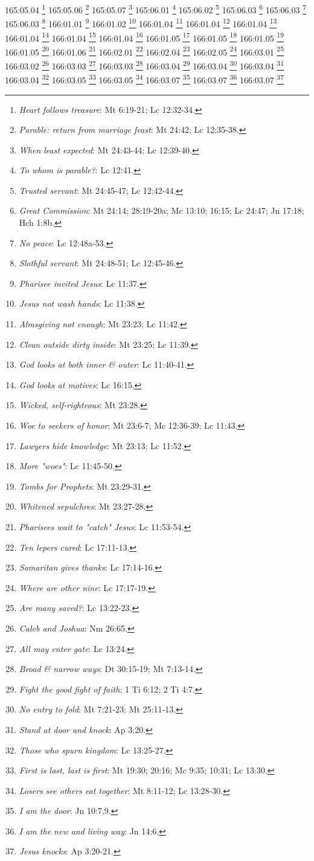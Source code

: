 165:05.04 \footnote{\textit{Heart follows treasure}: Mt 6:19-21; Lc 12:32-34.}
165:05.06 \footnote{\textit{Parable: return from marriage feast}: Mt 24:42; Lc 12:35-38.}
165:05.07 \footnote{\textit{When least expected}: Mt 24:43-44; Lc 12:39-40.}
165:06.01 \footnote{\textit{To whom is parable?}: Lc 12:41.}
165:06.02 \footnote{\textit{Trusted servant}: Mt 24:45-47; Lc 12:42-44.}
165:06.03 \footnote{\textit{Great Commission}: Mt 24:14; 28:19-20a; Mc 13:10; 16:15; Lc 24:47; Jn 17:18; Hch 1:8b.}
165:06.03 \footnote{\textit{No peace}: Lc 12:48a-53.}
165:06.03 \footnote{\textit{Slothful servant}: Mt 24:48-51; Lc 12:45-46.}
166:01.01 \footnote{\textit{Pharisee invited Jesus}: Lc 11:37.}
166:01.02 \footnote{\textit{Jesus not wash hands}: Lc 11:38.}
166:01.04 \footnote{\textit{Almsgiving not enough}: Mt 23:23; Lc 11:42.}
166:01.04 \footnote{\textit{Clean outside dirty inside}: Mt 23:25; Lc 11:39.}
166:01.04 \footnote{\textit{God looks at both inner & outer}: Lc 11:40-41.}
166:01.04 \footnote{\textit{God looks at motives}: Lc 16:15.}
166:01.04 \footnote{\textit{Wicked, self-righteous}: Mt 23:28.}
166:01.04 \footnote{\textit{Woe to seekers of honor}: Mt 23:6-7; Mc 12:36-39; Lc 11:43.}
166:01.05 \footnote{\textit{Lawyers hide knowledge}: Mt 23:13; Lc 11:52.}
166:01.05 \footnote{\textit{More "woes"}: Lc 11:45-50.}
166:01.05 \footnote{\textit{Tombs for Prophets}: Mt 23:29-31.}
166:01.05 \footnote{\textit{Whitened sepulchres}: Mt 23:27-28.}
166:01.06 \footnote{\textit{Pharisees wait to "catch" Jesus}: Lc 11:53-54.}
166:02.01 \footnote{\textit{Ten lepers cured}: Lc 17:11-13.}
166:02.04 \footnote{\textit{Samaritan gives thanks}: Lc 17:14-16.}
166:02.05 \footnote{\textit{Where are other nine}: Lc 17:17-19.}
166:03.01 \footnote{\textit{Are many saved?}: Lc 13:22-23.}
166:03.02 \footnote{\textit{Caleb and Joshua}: Nm 26:65.}
166:03.03 \footnote{\textit{All may enter gate}: Lc 13:24.}
166:03.03 \footnote{\textit{Broad & narrow ways}: Dt 30:15-19; Mt 7:13-14.}
166:03.04 \footnote{\textit{Fight the good fight of faith}: 1 Ti 6:12; 2 Ti 4:7.}
166:03.04 \footnote{\textit{No entry to fold}: Mt 7:21-23; Mt 25:11-13.}
166:03.04 \footnote{\textit{Stand at door and knock}: Ap 3:20.}
166:03.04 \footnote{\textit{Those who spurn kingdom}: Lc 13:25-27.}
166:03.05 \footnote{\textit{First is last, last is first}: Mt 19:30; 20:16; Mc 9:35; 10:31; Lc 13:30.}
166:03.05 \footnote{\textit{Losers see others eat together}: Mt 8:11-12; Lc 13:28-30.}
166:03.07 \footnote{\textit{I am the door}: Jn 10:7,9.}
166:03.07 \footnote{\textit{I am the new and living way}: Jn 14:6.}
166:03.07 \footnote{\textit{Jesus knocks}: Ap 3:20-21.}
